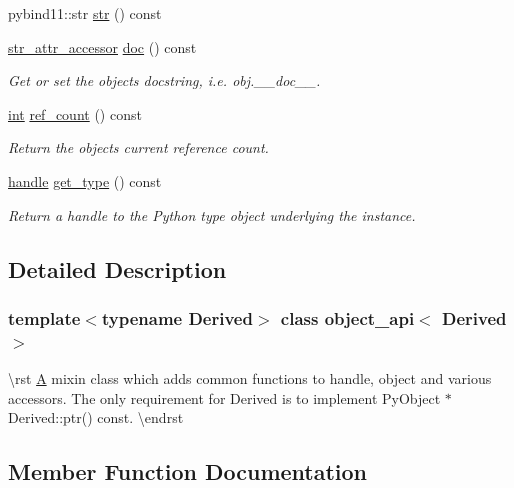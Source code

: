 \begin{DoxyCompactItemize}
\item 
pybind11\+::str \mbox{\hyperlink{classobject__api_afcae7cc760d93c39ae46192c2545f371}{str}} () const
\item 
\mbox{\hyperlink{pytypes_8h_a3e386ad6d0167a1022046e78dc281efd}{str\+\_\+attr\+\_\+accessor}} \mbox{\hyperlink{classobject__api_ad1febfb66cd1ecdc3d339ad0125f6da8}{doc}} () const
\begin{DoxyCompactList}\small\item\em Get or set the object\textquotesingle{}s docstring, i.\+e. {\ttfamily obj.\+\_\+\+\_\+doc\+\_\+\+\_\+}. \end{DoxyCompactList}\item 
\mbox{\hyperlink{warnings_8h_a74f207b5aa4ba51c3a2ad59b219a423b}{int}} \mbox{\hyperlink{classobject__api_ad342c9c181e1c9bdd634828276aebd24}{ref\+\_\+count}} () const
\begin{DoxyCompactList}\small\item\em Return the object\textquotesingle{}s current reference count. \end{DoxyCompactList}\item 
\mbox{\hyperlink{classhandle}{handle}} \mbox{\hyperlink{classobject__api_a6e7d5542b300b4ef13c65c58124a410a}{get\+\_\+type}} () const
\begin{DoxyCompactList}\small\item\em Return a handle to the Python type object underlying the instance. \end{DoxyCompactList}\end{DoxyCompactItemize}


\subsection{Detailed Description}
\subsubsection*{template$<$typename Derived$>$\newline
class object\+\_\+api$<$ Derived $>$}

\textbackslash{}rst \mbox{\hyperlink{struct_a}{A}} mixin class which adds common functions to {\ttfamily handle}, {\ttfamily object} and various accessors. The only requirement for {\ttfamily Derived} is to implement {\ttfamily Py\+Object $\ast$\+Derived\+::ptr() const}. \textbackslash{}endrst 

\subsection{Member Function Documentation}
\mbox{\label{classobject__api_a17b39579263007abe74cfbf80015ebd9}} 
